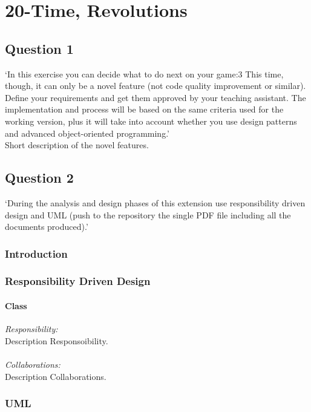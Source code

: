 \chapter{20-Time, Revolutions}

\section{Question 1}

`In this exercise you can decide what to do next on your game:3 This time, though, it can only be a
novel feature (not code quality improvement or similar).
Define your requirements and get them approved by your teaching assistant. The implementation
and process will be based on the same criteria used for the working version, plus it will take into
account whether you use design patterns and advanced object-oriented programming.' \\

Short description of the novel features.

\section{Question 2}

`During the analysis and design phases of this extension use responsibility driven design and UML
(push to the repository the single PDF file including all the documents produced).'

\subsection{Introduction}

\subsection{Responsibility Driven Design} 

\subsubsection{Class}
\textit{Responsibility:} \\
Description Responsoibility. \\ \\
\textit{Collaborations:} \\
Description Collaborations. 


\subsection{UML}